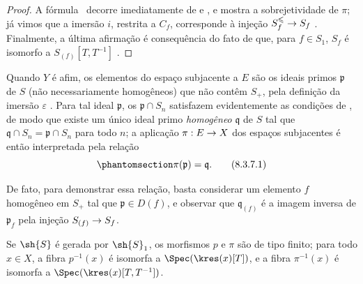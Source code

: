 \documentclass[oneside,10pt]{amsart}
\makeatletter
\renewcommand{\leq}{\leqslant}
\newcommand{\ega@arrow}[2]{\mathchoice{#1}{#2}{#2}{#2}}
\renewcommand{\to}{\ega@arrow{\longrightarrow}{\rightarrow}}
\newcommand{\oldpage}[2][]{\marginnote{\normalfont\footnotesize\textbf{#1}~|~#2}\ignorespaces}
\let\EGAOriginalLabel\label
\renewcommand{\label}[1]{\phantomsection\EGAOriginalLabel{#1}}
\makeatother
\begin{document}
\begin{proof}
A fórmula~ decorre imediatamente de  e , e mostra a sobrejetividade de $\pi$;
já vimos que a imersão $i$, restrita a $C_f$, corresponde
\oldpage[II]{166}
à injeção $S_f^\leq\to S_f$ .
Finalmente, a última afirmação é consequência do fato de que, para $f\in S_1$, $S_f$ é isomorfo a $S_{(f)}[T,T^{-1}]$ .
\end{proof}
\begin{remark}[8.3.7]
\label{II.8.3.7}
Quando $Y$ é afim, os elementos do espaço subjacente a $E$ são os ideais primos $\mathfrak{p}$ de $S$ (não necessariamente homogêneos) que não contêm $S_+$, pela definição da imersão $\varepsilon$ .
Para tal ideal $\mathfrak{p}$, os $\mathfrak{p}\cap S_n$ satisfazem evidentemente as condições de , de modo que existe um único ideal primo \emph{homogêneo} $\mathfrak{q}$ de $S$ tal que $\mathfrak{q}\cap S_n=\mathfrak{p}\cap S_n$ para todo $n$;
a aplicação $\pi:E\to X$ dos espaços subjacentes é então interpretada pela relação
\[
\label{II.8.3.7.1}
  \pi(\mathfrak{p}) = \mathfrak{q}.
\tag{8.3.7.1}
\]

De fato, para demonstrar essa relação, basta considerar um elemento $f$ homogêneo em $S_+$ tal que $\mathfrak{p}\in D(f)$, e observar que $\mathfrak{q}_{(f)}$ é a imagem inversa de $\mathfrak{p}_f$ pela injeção $S_{(f)}\to S_f$.
\end{remark}

\begin{corollary}[8.3.8]
\label{II.8.3.8}
Se $\sh{S}$ é gerada por $\sh{S}_1$, os morfismos $p$ e $\pi$ são de tipo finito;
para todo $x\in X$, a fibra $p^{-1}(x)$ é isomorfa a $\Spec(\kres(x)[T])$, e a fibra $\pi^{-1}(x)$ é isomorfa a $\Spec(\kres(x)[T,T^{-1}])$.
\end{corollary}
\end{document}
